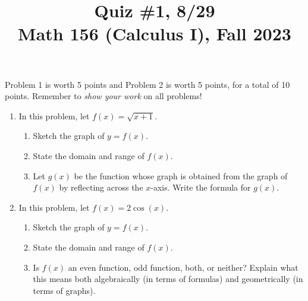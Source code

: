 \documentclass[11pt]{article}
\title{Quiz \#1, 8/29 \\ Math 156 (Calculus I), Fall 2023}
\date{}
\begin{document}
\maketitle

\thispagestyle{empty}

\vspace{-1cm}

Problem 1 is worth 5 points and Problem 2 is worth 5 points, for a total of 10 points. Remember to \emph{show your work} on all problems!

\begin{enumerate}
\item In this problem, let $f(x) = \sqrt{x+1}$.
\begin{enumerate}
\item Sketch the graph of $y=f(x)$.
\item State the domain and range of $f(x)$.
\item Let $g(x)$ be the function whose graph is obtained from the graph of $f(x)$ by reflecting across the $x$-axis. Write the formula for $g(x)$.
\end{enumerate}

\vspace{5cm}

\item In this problem, let $f(x) = 2\cos(x)$.
\begin{enumerate}
\item Sketch the graph of $y=f(x)$.
\item State the domain and range of $f(x)$.
\item Is $f(x)$ an even function, odd function, both, or neither? Explain what this means both algebraically (in terms of formulas) and geometrically (in terms of graphs).
\end{enumerate}

\end{enumerate}
\end{document}
